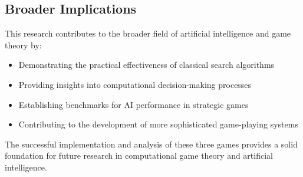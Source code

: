 \documentclass[12pt]{article}
\begin{document}
\subsection{Broader Implications}

This research contributes to the broader field of artificial intelligence and game theory by:

\begin{itemize}
    \item Demonstrating the practical effectiveness of classical search algorithms
    \item Providing insights into computational decision-making processes
    \item Establishing benchmarks for AI performance in strategic games
    \item Contributing to the development of more sophisticated game-playing systems
\end{itemize}

The successful implementation and analysis of these three games provides a solid foundation for future research in computational game theory and artificial intelligence.
\end{document}
